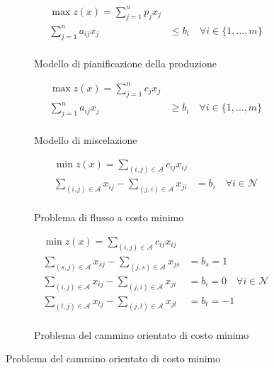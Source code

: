 \documentclass[\main/main.tex]{subfiles}
\begin{document}
\begin{figure}
	\begin{subfigure}{0.31\textwidth}
		\begin{align*}
			\max z(x) = \sum_{j=1}^n p_jx_j                                      \\
			\sum_{j=1}^n a_{ij}x_j & \leq b_i \quad \forall i \in \{1,\ldots,m\} \\
		\end{align*}
		\caption{Modello di pianificazione della produzione}
	\end{subfigure}
	\begin{subfigure}{0.31\textwidth}
		\begin{align*}
			\max z(x) = \sum_{j=1}^n c_jx_j                                      \\
			\sum_{j=1}^n a_{ij}x_j & \geq b_i \quad \forall i \in \{1,\ldots,m\} \\
		\end{align*}
		\caption{Modello di miscelazione}
	\end{subfigure}
	\begin{subfigure}{0.31\textwidth}
		\begin{align*}
			\min z(x) = \sum_{(i,j) \in \mathcal{A}} c_{ij}x_{ij}                                                             \\
			\sum_{(i,j) \in \mathcal{A}} x_{ij} - \sum_{(j,i) \in \mathcal{A}} x_{ji} & = b_i \quad \forall i \in \mathcal{N} \\
		\end{align*}
		\caption{Problema di flusso a costo minimo}
	\end{subfigure}
	\begin{subfigure}{0.31\textwidth}
		\begin{align*}
			\min z(x) = \sum_{(i,j) \in \mathcal{A}} c_{ij}x_{ij}                                                                 \\
			\sum_{(s,j) \in \mathcal{A}} x_{sj} - \sum_{(j,s) \in \mathcal{A}} x_{js} & = b_s = 1                                 \\
			\sum_{(i,j) \in \mathcal{A}} x_{ij} - \sum_{(j,i) \in \mathcal{A}} x_{ji} & = b_i = 0 \quad \forall i \in \mathcal{N} \\
			\sum_{(t,j) \in \mathcal{A}} x_{tj} - \sum_{(j,t) \in \mathcal{A}} x_{jt} & = b_t = -1                                \\
		\end{align*}
		\caption{Problema del cammino orientato di costo minimo}

\end{subfigure}
\end{figure}
\end{document}
